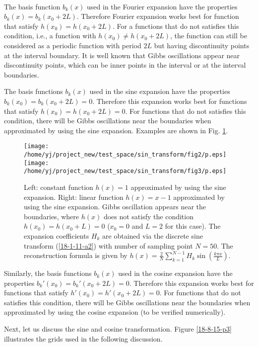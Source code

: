 \documentclass{article}
\begin{document}
\

The basis function $b_k (x)$ used in the Fourier expansion have the
properties $b_k (x) = b_k (x_0 + 2 L)$. Therefore Fourier expansion works best
for function that satisfy $h (x_0) = h (x_0 + 2 L)$. For a functions that do
not satisfies this condition, i.e., a function with $h (x_0) \neq h (x_0 + 2
L)$, the function can still be considered as a periodic function with period
$2 L$ but having discontinuity points at the interval boundary. It is well
known that Gibbs oscillations appear near discontinuity points, which can be
inner points in the interval or at the interval boundaries.

The basis functions $b_k (x)$ used in the sine expansion have the properties
$b_k (x_0) = b_k (x_0 + 2 L) = 0$. Therefore this expansion works best for
functions that satisfy $h (x_0) = h (x_0 + 2 L) = 0$. For functions that do
not satisfies this condition, there will be Gibbs oscillations near the
boundaries when approximated by using the sine expansion. Examples are shown
in Fig. \ref{18-1-11-a1}.

\begin{figure}[h]
  \texttt{[image: /home/yj/project\_new/test\_space/sin\_transform/fig2/p.eps]}\texttt{[image: /home/yj/project\_new/test\_space/sin\_transform/fig3/p.eps]}
  \caption{\label{18-1-11-a1}Left: constant function $h (x) = 1$ approximated
  by using the sine expansion. Right: linear function $h (x) = x - 1$
  approximated by using the sine expansion. Gibbs oscillation appears near the
  boundaries, where $h (x)$ does not satisfy the condition $h (x_0) = h (x_0 +
  L) = 0$ ($x_0 = 0$ and $L = 2$ for this case). The expansion coefficients
  $H_k$ are obtained via the discrete sine transform (\ref{18-1-11-a2}) with
  number of sampling point $N = 50$. The reconstruction formula is given by $h(x) = \frac{2}{N} \sum_{k = 1}^{N - 1} H_k \sin ( \frac{k \pi x}{L})$.}
\end{figure}

Similarly, the basis functions $b_k (x)$ used in the cosine expansion have the
properties $b_k' (x_0) = b_k' (x_0 + 2 L) = 0$. Therefore this expansion works
best for functions that satisfy $h' (x_0) = h' (x_0 + 2 L) = 0$. For functions
that do not satisfies this condition, there will be Gibbs oscillations near
the boundaries when approximated by using the cosine expansion (to be verified
numerically).

Next, let us discuss the sine and cosine transformation. Figure
\ref{18-8-15-p3} illustrates the grids used in the following discussion.
\end{document}
